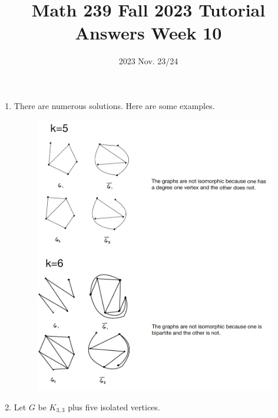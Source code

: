 \title{Math 239 Fall 2023 Tutorial Answers Week 10}

\date{2023 Nov. 23/24}
\maketitle

\begin{enumerate}
    \begin{enumerate}
        \item There are numerous solutions. Here are some examples.
        \begin{figure}[hbt!]
            \centering
            \includegraphics[scale=.6]{Screenshot 2023-11-20 at 5.03.50 PM.png}
        \end{figure}
        \item Let $G$ be $K_{3,3}$ plus five isolated vertices. 
    \end{enumerate}



\end{enumerate}
